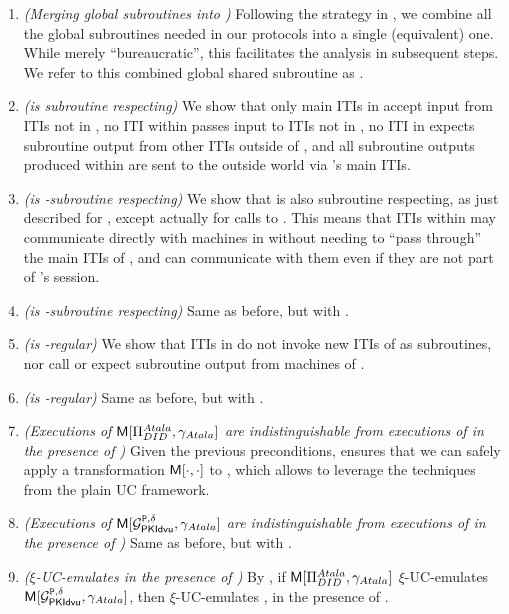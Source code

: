 \begin{enumerate}
\item \emph{(Merging global subroutines into \gAtala)} Following the strategy
  in \cite{bhz21}, we combine all the global subroutines needed in our protocols
  into a single (equivalent) one. While merely ``bureaucratic'', this
  facilitates the analysis in subsequent steps. We refer to this combined
  global shared subroutine as \gAtala.
\item \emph{(\gAtala is subroutine respecting)} We show that only main ITIs
  in \gAtala accept input from ITIs not in \gAtala, no ITI within \gAtala passes
  input to ITIs not in \gAtala, no ITI in \gAtala expects subroutine output from
  other ITIs outside of \gAtala, and all subroutine outputs produced within
  \gAtala are sent to the outside world via \gAtala's main ITIs.
\item \emph{(\RealPKIDIDAtala is \gAtala-subroutine respecting)} We show that
  \RealPKIDIDAtala is also subroutine respecting, as just described for \gAtala,
  except actually for calls to \gAtala. This means that ITIs within
  \RealPKIDIDAtala may communicate directly with machines in \gAtala without
  needing to ``pass through'' the main ITIs of \RealPKIDIDAtala, and can
  communicate with them even if they are not part of \RealPKIDIDAtala's session.
\item \emph{(\IdealGPKIDID is \gAtala-subroutine respecting)} Same as before,
  but with \IdealGPKIDID.
\item \emph{(\gAtala is \RealPKIDIDAtala-regular)} We show that ITIs in \gAtala
  do not invoke new ITIs of \RealPKIDIDAtala as subroutines, nor call or expect
  subroutine output from machines of \RealPKIDIDAtala.
\item \emph{(\gAtala is \IdealGPKIDID-regular)} Same as before, but with
  \IdealGPKIDID.
\item \emph{(Executions of $\mathsf{M}[\Pi_{DID}^{Atala},\gamma_{Atala}]$ are indistinguishable
    from executions of \RealPKIDIDAtala in the presence of \gAtala)} Given the
  previous preconditions, \cite[Proposition 3.4]{bch+20} ensures that we can
  safely apply a transformation $\mathsf{M}[\cdot,\cdot]$ to \RealPKIDIDAtala, which
  allows to leverage the techniques from the plain UC framework.
\item \emph{(Executions of $\mathsf{M}[\mathcal{G}^{\mathtt{P},\delta}_{\mathsf{PKIdvu}},\gamma_{Atala}]$ are indistinguishable
    from executions of \IdealGPKIDID in the presence of \gAtala)} Same as before,
  but with \IdealGPKIDID.
\item \emph{(\RealPKIDIDAtala $\xi$-UC-emulates \IdealGPKIDID in the presence
    of \gAtala)} By \cite[Definition 3.1]{bch+20}, if $\mathsf{M}[\Pi_{DID}^{Atala},
  \gamma_{Atala}]$ $\xi$-UC-emulates $\mathsf{M}[\mathcal{G}^{\mathtt{P},\delta}_{\mathsf{PKIdvu}},\gamma_{Atala}]$, then
  \RealPKIDIDAtala $\xi$-UC-emulates \IdealGPKIDID, in the presence
  of \gAtala.
\end{enumerate}

